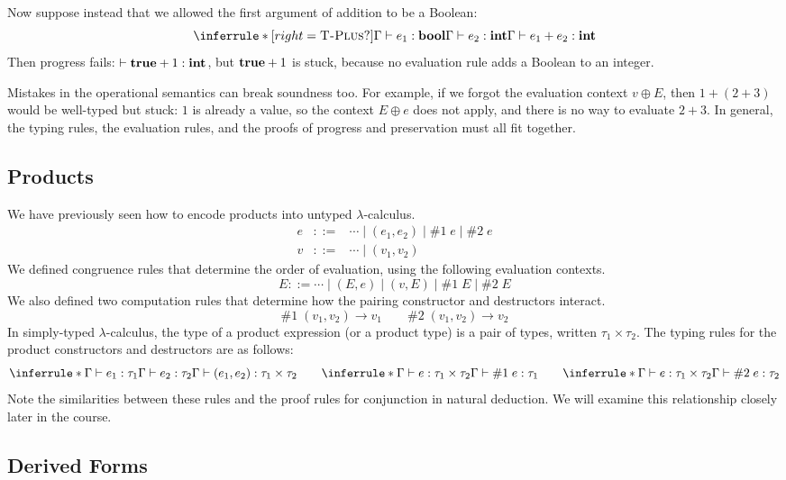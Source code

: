 Now suppose instead that we allowed the first argument of addition to be a Boolean:
\[
\inferrule*[right=\rn{T-Plus?}]{\Gamma \vdash e_1 : \tbool \\ \Gamma \vdash e_2 : \tint}{\Gamma \vdash e_1 + e_2 : \tint}
\]
Then progress fails: $\vdash \mathbf{true} + 1 : \mathbf{int}$, but $\mathbf{true} + 1$ is stuck, because no evaluation rule adds a Boolean to an integer.

Mistakes in the operational semantics can break soundness too. For example, if we forgot the evaluation context $v \oplus E$, then $1 + (2 + 3)$ would be well-typed but stuck: $1$ is already a value, so the context $E \oplus e$ does not apply, and there is no way to evaluate $2 + 3$. In general, the typing rules, the evaluation rules, and the proofs of progress and preservation must all fit together.

\subsection{Products}

We have previously seen how to encode products into untyped $\lambda$-calculus.
\[
\begin{array}{rcl}
e & ::= & \cdots \mid (e_1, e_2) \mid \#1\; e \mid \#2\; e \\
v & ::= & \cdots \mid (v_1, v_2)
\end{array}
\]
We defined congruence rules that determine the order of evaluation, using the following evaluation contexts.
\[
E ::= \cdots \mid (E, e) \mid (v, E) \mid \#1\; E \mid \#2\; E
\]
We also defined two computation rules that determine how the pairing constructor and destructors interact.
\[
\#1\; (v_1, v_2) \to v_1
\qquad
\#2\; (v_1, v_2) \to v_2
\]
In simply-typed $\lambda$-calculus, the type of a product expression (or a product type) is a pair of types, written $\tau_1 \times \tau_2$. The typing rules for the product constructors and destructors are as follows:
\[
\inferrule*{\Gamma \vdash e_1 : \tau_1 \\ \Gamma \vdash e_2 : \tau_2}{\Gamma \vdash (e_1, e_2) : \tau_1 \times \tau_2}
\qquad
\inferrule*{\Gamma \vdash e : \tau_1 \times \tau_2}{\Gamma \vdash \#1\; e : \tau_1}
\qquad
\inferrule*{\Gamma \vdash e : \tau_1 \times \tau_2}{\Gamma \vdash \#2\; e : \tau_2}
\]
Note the similarities between these rules and the proof rules for conjunction in natural deduction. We will examine this relationship closely later in the course.

\subsection{Derived Forms}

